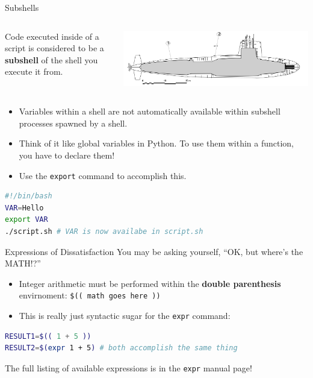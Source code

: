 \documentclass[11pt]{beamer}
\begin{document}
\begin{frame}[fragile=singleslide]{Subshells}
\begin{columns}
\begin{column}{0.6\textwidth}
Code executed inside of a script is considered to be a \textbf{subshell} of the shell you execute it from.  
\end{column}
\begin{column}{0.38\textwidth}
\vspace{-0.5em}
\center
\includegraphics[scale=0.05]{subshell.png}
\end{column}
\end{columns}
\begin{itemize}
\item Variables within a shell are not automatically available within subshell processes spawned by a shell.  
\item Think of it like global variables in Python.  To use them within a function, you have to declare them!
\item Use the \texttt{export} command to accomplish this.
\end{itemize}
\begin{lstlisting}[style=terminal, language=bash]
#!/bin/bash
VAR=Hello
export VAR
./script.sh # VAR is now availabe in script.sh
\end{lstlisting}
\end{frame}

\begin{frame}[fragile=singleslide]{Expressions of Dissatisfaction}
You may be asking yourself, ``OK, but where's the MATH!?''
\begin{itemize}
\item Integer arithmetic must be performed within the \textbf{double parenthesis} envirnoment: \texttt{\$(( math goes here ))}
\item This is really just syntactic sugar for the \texttt{expr} command:
\end{itemize}
\begin{lstlisting}[style=terminal, language=bash]
RESULT1=$(( 1 + 5 ))
RESULT2=$(expr 1 + 5) # both accomplish the same thing
\end{lstlisting}
The full listing of available expressions is in the \texttt{expr} manual page!
\end{frame}
\end{document}
